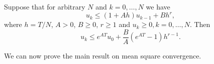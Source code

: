 \documentclass[final,onefignum,onetabnum]{siamonline171218}
\begin{document}
\begin{lemma}\label{lem:RecurrenceBound} Suppose that for arbitrary $N$ and $k = 0, \ldots, N$ we have
	\begin{equation}
		u_{k} \leq (1 + Ah) u_{k-1} + Bh^r,
	\end{equation}
	where $h = T / N$, $A > 0$, $B \geq 0$, $r \geq 1$ and $u_k \geq 0, k = 0, \ldots, N$. Then
	\begin{equation}
		u_k \leq e^{AT}u_0 + \frac{B}{A}(e^{AT} - 1) h^{r-1}.
	\end{equation}
\end{lemma}
 We can now prove the main result on mean square convergence.
\end{document}
